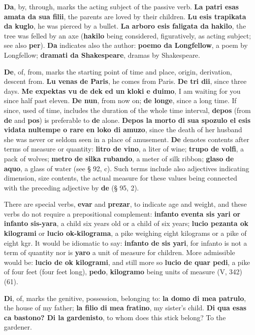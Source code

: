 \textbf{Da}, by, through, marks the acting subject of the passive verb. \textbf{La patri esas amata da sua filii}, the parents are loved by their children. \textbf{Lu esis trapikata da kuglo}, he was pierced by a bullet. \textbf{La arboro esis faligata da hakilo}, the tree was felled by an axe (\textbf{hakilo} being considered, figuratively, as acting subject; see also \textbf{per}). \textbf{Da} indicates also the author: \textbf{poemo da Longfellow}, a poem by Longfellow; \textbf{dramati da Shakespeare}, dramas by Shakespeare.

\textbf{De}, of, from, marks the starting point of time and place, origin, derivation, descent from. \textbf{Lu venas de Paris}, he comes from Paris. \textbf{De tri dii}, since three days. \textbf{Me expektas vu de dek ed un kloki e duimo}, I am waiting for you since half past eleven. \textbf{De nun}, from now on; \textbf{de longe}, since a long time. If since, used of time, includes the duration of the whole time interval, \textbf{depos} (from \textbf{de} and \textbf{pos}) is preferable to \textbf{de} alone. \textbf{Depos la morto di sua spozulo el esis vidata nultempe o rare en loko di amuzo}, since the death of her husband she was never or seldom seen in a place of amusement. \textbf{De} denotes contents after terms of measure or quantity: \textbf{litro de vino}, a liter of wine; \textbf{trupo de volfi}, a pack of wolves; \textbf{metro de silka rubando}, a meter of silk ribbon; \textbf{glaso de aquo}, a glass of water (see § 92, c). Such terms include also adjectives indicating dimension, size contents, the actual measure for these values being connected with the preceding adjective by \textbf{de} (§ 95, 2).

There are special verbs, \textbf{evar} and \textbf{prezar}, to indicate age and weight, and these verbs do not require a prepositional complement: \textbf{infanto eventa sis yari or infanto sis-yara}, a child six years old or a child of six years; \textbf{lucio pezanta ok kilogrami} or \textbf{lucio ok-kilograma}, a pike weighing eight kilograms or a pike of eight kgr. It would be idiomatic to say: \textbf{infanto de sis yari}, for infanto is not a term of quantity nor is \textbf{yaro} a unit of measure for children. More admissible would be: \textbf{lucio de ok kilogrami}, and still more so \textbf{lucio de quar pedi}, a pike of four feet (four feet long), \textbf{pedo}, \textbf{kilogramo} being units of measure (V, 342) (61).

\textbf{Di}, of, marks the genitive, possession, belonging to: \textbf{la domo di mea patrulo}, the house of my father; \textbf{la filio di mea fratino}, my sister's child. \textbf{Di qua esas ca bastono? Di la gardenisto}, to whom does this stick belong? To the gardener.

